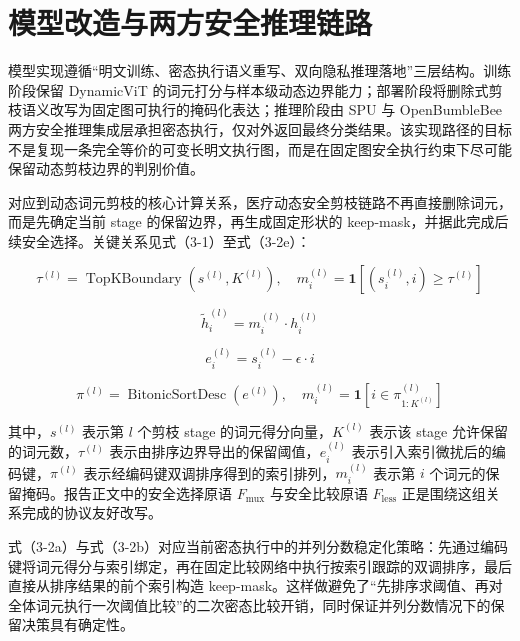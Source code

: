 \section{模型改造与两方安全推理链路}

模型实现遵循“明文训练、密态执行语义重写、双向隐私推理落地”三层结构。训练阶段保留 DynamicViT 的词元打分与样本级动态边界能力；部署阶段将删除式剪枝语义改写为固定图可执行的掩码化表达；推理阶段由 SPU 与 OpenBumbleBee 两方安全推理集成层承担密态执行，仅对外返回最终分类结果。该实现路径的目标不是复现一条完全等价的可变长明文执行图，而是在固定图安全执行约束下尽可能保留动态剪枝边界的判别价值。

对应到动态词元剪枝的核心计算关系，医疗动态安全剪枝链路不再直接删除词元，而是先确定当前 stage 的保留边界，再生成固定形状的 keep-mask，并据此完成后续安全选择。关键关系见式（3-1）至式（3-2e）：

\begin{equation}
\tau^{(l)}=\operatorname{TopKBoundary}\!\left(s^{(l)},K^{(l)}\right), \quad m_i^{(l)}=\mathbf{1}\!\left[\left(s_i^{(l)},i\right)\ge \tau^{(l)}\right]
\tag{3-1}
\end{equation}

\begin{equation}
\tilde{h}_i^{(l)}=m_i^{(l)} \cdot h_i^{(l)}
\tag{3-2}
\end{equation}

\begin{equation}
e_i^{(l)}=s_i^{(l)}-\epsilon \cdot i
\tag{3-2a}
\end{equation}

\begin{equation}
\pi^{(l)}=\operatorname{BitonicSortDesc}\!\left(e^{(l)}\right), \quad m_i^{(l)}=\mathbf{1}\!\left[i\in \pi^{(l)}_{1:K^{(l)}}\right]
\tag{3-2b}
\end{equation}

其中，$s^{(l)}$ 表示第 $l$ 个剪枝 stage 的词元得分向量，$K^{(l)}$ 表示该 stage 允许保留的词元数，$\tau^{(l)}$ 表示由排序边界导出的保留阈值，$e_i^{(l)}$ 表示引入索引微扰后的编码键，$\pi^{(l)}$ 表示经编码键双调排序得到的索引排列，$m_i^{(l)}$ 表示第 $i$ 个词元的保留掩码。报告正文中的安全选择原语 $F_{\text{mux}}$ 与安全比较原语 $F_{\text{less}}$ 正是围绕这组关系完成的协议友好改写。

式（3-2a）与式（3-2b）对应当前密态执行中的并列分数稳定化策略：先通过编码键将词元得分与索引绑定，再在固定比较网络中执行按索引跟踪的双调排序，最后直接从排序结果的前个索引构造 keep-mask。这样做避免了“先排序求阈值、再对全体词元执行一次阈值比较”的二次密态比较开销，同时保证并列分数情况下的保留决策具有确定性。

